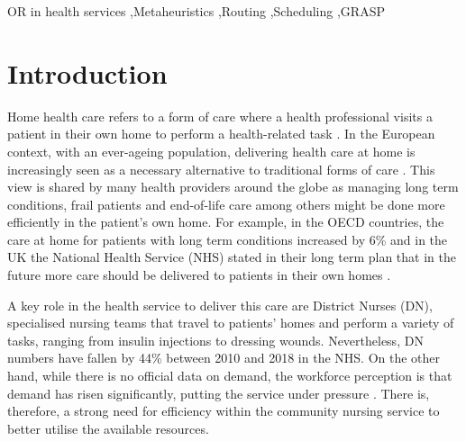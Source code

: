 \documentclass[a4paper,11pt,authoryear]{elsarticle}
\begin{document}
\begin{frontmatter}
\begin{abstract}
\end{abstract}

\begin{keyword}
OR in health services \sep Metaheuristics \sep Routing \sep Scheduling \sep GRASP
\end{keyword}


\end{frontmatter}


\section{Introduction}
\label{sec:intro}
\noindent Home health care refers to a form of care where a health professional visits a patient in their own home to perform a health-related task \citep{cisse2017}. In the European context, with an ever-ageing population, delivering health care at home is increasingly seen as a necessary alternative to traditional forms of care \citep{tarricone2008}.
This view is shared by many health providers around the globe as managing long term conditions, frail patients and end-of-life care among others might be done more efficiently in the patient's own home. For example, in the OECD countries, the care at home for patients with long term conditions increased by 6\% \citep{oecd2019} and in the UK the National Health Service (NHS) stated in their long term plan that in the future more care should be delivered to patients in their own homes \citep{nhs2019}.

A key role in the health service to deliver this care are District Nurses (DN), specialised nursing teams that travel to patients' homes and perform a variety of tasks, ranging from insulin injections to dressing wounds. Nevertheless, DN numbers have fallen by 44\% \citep{nhs2018} between 2010 and 2018 in the NHS. On the other hand, while there is no official data on demand, the workforce perception is that demand has risen significantly, putting the service under pressure \citep{robertson2017}. There is, therefore, a strong need for efficiency within the community nursing service to better utilise the available resources.
\end{document}
